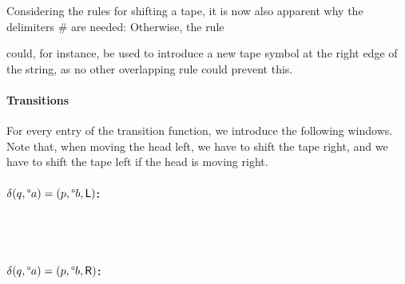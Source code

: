 \documentclass[a4paper,UKenglish,cleveref, autoref]{lipics-v2019}
\begin{document}
Considering the rules for shifting a tape, it is now also apparent why the delimiters \# are needed: Otherwise, the rule 
\begin{center}
\end{center}
could, for instance, be used to introduce a new tape symbol at the right edge of the string, as no other overlapping rule could prevent this. 

\paragraph*{Transitions}

For every entry of the transition function, we introduce the following windows. Note that, when moving the head left, we have to shift the tape right, and we have to shift the tape left if the head is moving right.

\paragraph*{$\delta(q, \degree a) = (p, \degree b, \textsf{L})$:}
\begin{center}
   \\[3ex]
   \\[3ex]
\end{center}

\paragraph*{$\delta(q, \degree a) = (p, \degree b, \textsf{R})$:}
\begin{center}
   \\[3ex]
   \\[3ex]
\end{center}
\end{document}
